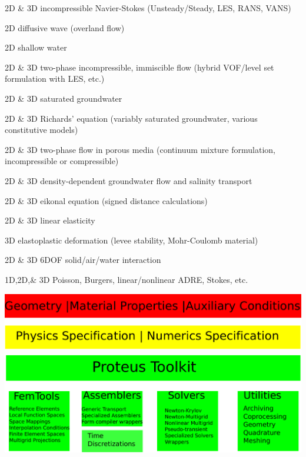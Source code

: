 \documentclass{beamer}
\begin{document}
\begin{frame}
\bit
\footnotesize
\item 2D \& 3D incompressible Navier-Stokes (Unsteady/Steady, LES, RANS, VANS)
\item 2D diffusive wave (overland flow)
\item 2D shallow water
\item 2D \& 3D two-phase incompressible, immiscible flow (hybrid VOF/level set formulation with LES, etc.)
\item 2D \& 3D saturated groundwater
\item 2D \& 3D Richards' equation (variably saturated groundwater, various constitutive models)
\item 2D \& 3D two-phase flow in porous media (continuum mixture formulation, incompressible or compressible)
\item 2D \& 3D density-dependent groundwater flow and salinity transport
\item 2D \& 3D eikonal equation (signed distance calculations)
\item 2D \& 3D linear elasticity
\item 3D elastoplastic deformation (levee stability, Mohr-Coulomb material)
\item 2D \& 3D 6DOF solid/air/water interaction
\item 1D,2D,\& 3D Poisson, Burgers, linear/nonlinear ADRE, Stokes, etc.
\eit
\end{frame}

\begin{frame}
\begin{center}
\includegraphics[scale=0.4]{modules.pdf}
\end{center}
\end{frame}
\end{document}
